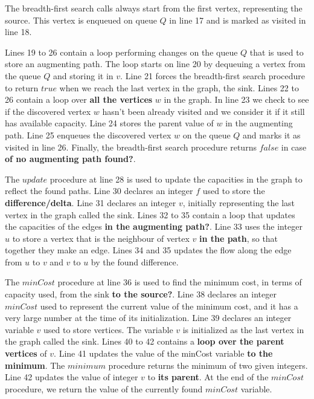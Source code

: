 \documentclass{l4proj}
\begin{document}
\noindent The breadth-first search calls always start from the first vertex, representing the source. This vertex is enqueued on queue $Q$ in line 17 and is marked as visited in line 18.

\noindent Lines 19 to 26 contain a loop performing changes on the queue $Q$ that is used to store an augmenting path. The loop starts on line 20 by dequeuing a vertex from the queue $Q$ and storing it in $v$. Line 21 forces the breadth-first search procedure to return $true$ when we reach the last vertex in the graph, the sink. Lines 22 to 26 contain a loop over \textbf{all the vertices} $w$ in the graph. In line 23 we check to see if the discovered vertex $w$ hasn't been already visited and we consider it if it still has available capacity. Line 24 stores the parent value of $w$ in the augmenting path. Line 25 enqueues the discovered vertex $w$ on the queue $Q$ and marks it as visited in line 26. Finally, the breadth-first search procedure returns $false$ in case \textbf{of no augmenting path found?}.

\noindent The $update$ procedure at line 28 is used to update the capacities in the graph to reflect the found paths. Line 30 declares an integer $f$ used to store the \textbf{difference/delta}. Line 31 declares an integer $v$, initially representing the last vertex in the graph called the sink. Lines 32 to 35 contain a loop that updates the capacities of the edges \textbf{in the augmenting path?}. Line 33 uses the integer $u$ to store a vertex that is the neighbour of vertex $v$ \textbf{in the path}, so that together they make an edge. Lines 34 and 35 updates the flow along the edge from $u$ to $v$ and $v$ to $u$ by the found difference.

\noindent The $minCost$ procedure at line 36 is used to find the minimum cost, in terms of capacity used, from the sink \textbf{to the source?}. Line 38 declares an integer $minCost$ used to represent the current value of the minimum cost, and it has a very large number at the time of its initialization. Line 39 declares an integer variable $v$ used to store vertices. The variable $v$ is initialized as the last vertex in the graph called the sink. Lines 40 to 42 contains a \textbf{loop over the parent vertices} of $v$. Line 41 updates the value of the minCost variable \textbf{to the minimum}. The $minimum$ procedure returns the minimum of two given integers. Line 42 updates the value of integer $v$ to \textbf{its parent}. At the end of the $minCost$ procedure, we return the value of the currently found $minCost$ variable.
\end{document}
